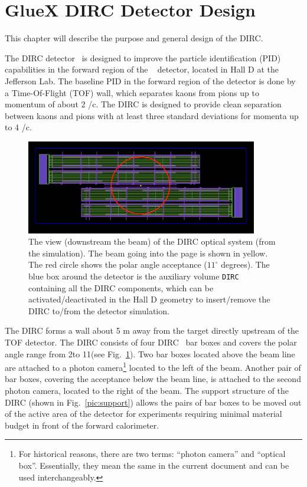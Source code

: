 \section{GlueX DIRC Detector Design}

This chapter will describe the purpose and general design of the \gluex DIRC.
\vspace{0.5cm}

The \gluex DIRC detector~\cite{dirc} is designed to improve the particle identification (PID) capabilities in the forward region of the \gluex~\cite{gluex1, gluex2} detector, located in Hall D at the Jefferson Lab. The baseline PID in the forward region of the \gluex detector is done by a Time-Of-Flight (TOF) wall, which separates kaons from pions up to momentum of about 2 \gev/c. The \gluex DIRC is designed to provide clean separation between kaons and pions with at least three standard deviations for momenta up to 4 \gev/c.

\begin{figure}[!htb]
\centering
\includegraphics[width=0.9\textwidth]{pics/sim1.png}
\caption{\label{pic:sim}
The view (downstream the beam) of the \gluex DIRC optical system (from the simulation). The beam going into the page is shown in yellow. The red circle shows the polar angle acceptance ($11^{\circ}$ degrees).
The blue box around the detector is the auxiliary volume \texttt{DIRC} containing all the DIRC components, which can be activated/deactivated in the Hall D geometry to insert/remove the \gluex DIRC to/from the \gluex detector simulation.}
\end{figure}

The \gluex DIRC forms a wall about 5 m away from the target directly upstream of the TOF detector. The DIRC consists of four \babar DIRC~\cite{bdirc1} bar boxes and covers the polar angle range from 2\mydeg to 11\mydeg (see Fig.~\ref{pic:sim}). Two bar boxes located above the beam line are attached to a photon camera\footnote{For historical reasons, there are two terms: ``photon camera'' and ``optical box''. Essentially, they mean the same in the current document and can be used interchangeably.} located to the left of the beam. Another pair of bar boxes, covering the acceptance below the beam line, is attached to the second photon camera, located to the right of the beam. The support structure of the DIRC (shown in Fig.~\ref{pic:support}) allows the pairs of bar boxes to be moved out of the active area of the detector for experiments requiring minimal material budget in front of the forward calorimeter.

